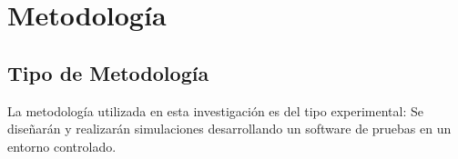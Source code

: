 







\section{Metodología}
\subsection{Tipo de Metodología}

La metodología utilizada en esta investigación es del tipo experimental: Se diseñarán y realizarán simulaciones desarrollando un software de pruebas en un entorno controlado. 

